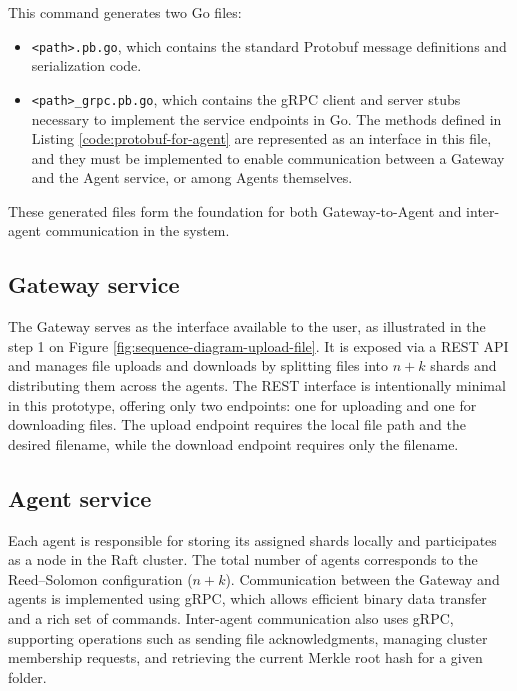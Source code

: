 This command generates two Go files: 
\begin{itemize}
    \item \texttt{<path>.pb.go}, which contains the standard Protobuf message definitions and serialization code.
    \item \texttt{<path>\_grpc.pb.go}, which contains the gRPC client and server stubs necessary to implement the service endpoints in Go. The methods defined in Listing \ref{code:protobuf-for-agent} are represented as an interface in this file, and they must be implemented to enable communication between a Gateway and the Agent service, or among Agents themselves.
\end{itemize}

These generated files form the foundation for both Gateway-to-Agent and inter-agent communication in the system.

\subsection{Gateway service} 

The Gateway serves as the interface available to the user, as illustrated in the step 1 on Figure \ref{fig:sequence-diagram-upload-file}. It is exposed via a REST API and manages file uploads and downloads by splitting files into $n+k$ shards and distributing them across the agents. The REST interface is intentionally minimal in this prototype, offering only two endpoints: one for uploading and one for downloading files. The upload endpoint requires the local file path and the desired filename, while the download endpoint requires only the filename.


\subsection{Agent service}

Each agent is responsible for storing its assigned shards locally and participates as a node in the Raft cluster. The total number of agents corresponds to the Reed–Solomon configuration ($n+k$). Communication between the Gateway and agents is implemented using gRPC, which allows efficient binary data transfer and a rich set of commands. Inter-agent communication also uses gRPC, supporting operations such as sending file acknowledgments, managing cluster membership requests, and retrieving the current Merkle root hash for a given folder.